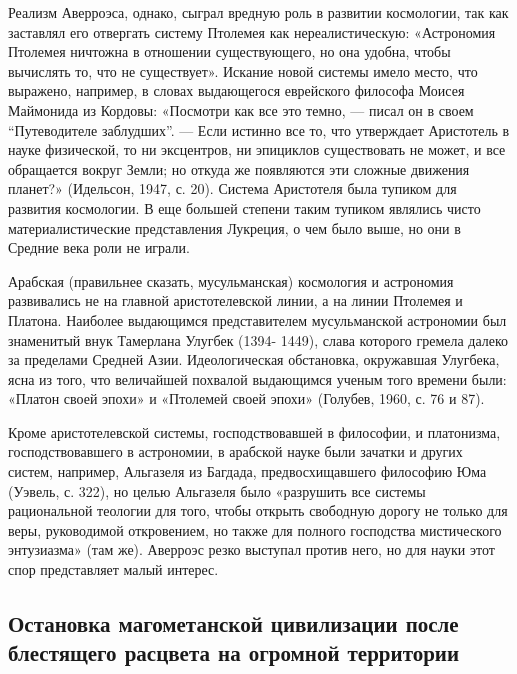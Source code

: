 Реализм Аверроэса, однако, сыграл  вредную роль в развитии космологии,
так как заставлял его отвергать систему Птолемея как нереалистическую:
«Астрономия  Птолемея  ничтожна  в  отношении  существующего,  но  она
удобна, чтобы вычислять то, что  не существует». Искание новой системы
имело место,  что выражено, например, в  словах выдающегося еврейского
философа Моисея Маймонида из Кордовы: «Посмотри как все это темно, ---
писал он в своем ``Путеводителе  заблудших''. --- Если истинно все то,
что утверждает  Аристотель в  науке физической,  то ни  эксцентров, ни
эпициклов существовать  не может,  и все  обращается вокруг  Земли; но
откуда же появляются эти сложные движения планет?» (Идельсон, 1947, с.
20).  Система  Аристотеля  была  тупиком для  развития  космологии.  В
еще большей  степени таким  тупиком являлись  чисто материалистические
представления Лукреция, о чем было выше, но они в Средние века роли не
играли.

Арабская (правильнее  сказать, мусульманская) космология  и астрономия
развивались не на главной аристотелевской линии, а на линии Птолемея и
Платона. Наиболее  выдающимся представителем  мусульманской астрономии
был  знаменитый внук  Тамерлана Улугбек  (1394- 1449),  слава которого
гремела далеко  за пределами Средней Азии.  Идеологическая обстановка,
окружавшая Улугбека, ясна из  того, что величайшей похвалой выдающимся
ученым  того времени  были:  «Платон своей  эпохи»  и «Птолемей  своей
эпохи» (Голубев, 1960, с. 76 и 87).

Кроме  аристотелевской   системы,  господствовавшей  в   философии,  и
платонизма,   господствовавшего  в   астрономии,   в  арабской   науке
были  зачатки  и  других   систем,  например,  Альгазеля  из  Багдада,
предвосхищавшего философию  Юма (Уэвель,  с. 322), но  целью Альгазеля
было  «разрушить все  системы  рациональной теологии  для того,  чтобы
открыть свободную дорогу не  только для веры, руководимой откровением,
но  также для  полного господства  мистического энтузиазма»  (там же).
Аверроэс  резко  выступал   против  него,  но  для   науки  этот  спор
представляет малый интерес.

\subsection{Остановка   магометанской  цивилизации   после  блестящего
расцвета на огромной территории}

